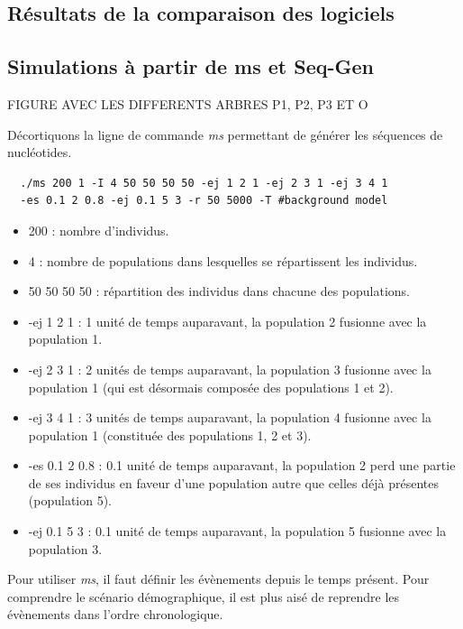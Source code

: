 \documentclass[12pt,twoside]{reedthesis}
\theoremstyle{definition}
\theoremstyle{definition}
\theoremstyle{remark}
\begin{document}
  \subsection{Résultats de la comparaison des
  logiciels}\label{resultats-de-la-comparaison-des-logiciels}
  
  \subsection{Simulations à partir de ms et
  Seq-Gen}\label{simulations-a-partir-de-ms-et-seq-gen}
  
  FIGURE AVEC LES DIFFERENTS ARBRES P1, P2, P3 ET O
  
  Décortiquons la ligne de commande \emph{ms} permettant de générer les
  séquences de nucléotides.
  
  \begin{verbatim}
  ./ms 200 1 -I 4 50 50 50 50 -ej 1 2 1 -ej 2 3 1 -ej 3 4 1 
  -es 0.1 2 0.8 -ej 0.1 5 3 -r 50 5000 -T #background model
  \end{verbatim}
  
  \begin{itemize}
  \item
    200 : nombre d'individus.
  \item
    4 : nombre de populations dans lesquelles se répartissent les
    individus.
  \item
    50 50 50 50 : répartition des individus dans chacune des populations.
  \item
    -ej 1 2 1 : 1 unité de temps auparavant, la population 2 fusionne avec
    la population 1.
  \item
    -ej 2 3 1 : 2 unités de temps auparavant, la population 3 fusionne
    avec la population 1 (qui est désormais composée des populations 1 et
    2).
  \item
    -ej 3 4 1 : 3 unités de temps auparavant, la population 4 fusionne
    avec la population 1 (constituée des populations 1, 2 et 3).
  \item
    -es 0.1 2 0.8 : 0.1 unité de temps auparavant, la population 2 perd
    une partie de ses individus en faveur d'une population autre que
    celles déjà présentes (population 5).
  \item
    -ej 0.1 5 3 : 0.1 unité de temps auparavant, la population 5 fusionne
    avec la population 3.
  \end{itemize}
  
  Pour utiliser \emph{ms}, il faut définir les évènements depuis le temps
  présent. Pour comprendre le scénario démographique, il est plus aisé de
  reprendre les évènements dans l'ordre chronologique.
  
\end{document}
